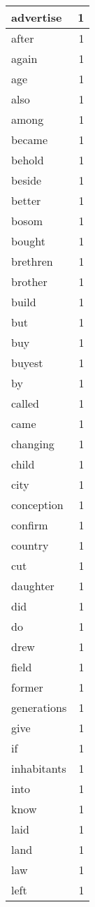 \begin{center}
\begin{longtable}{l|r}
advertise & 1 \\ \hline
after & 1 \\ \hline
again & 1 \\ \hline
age & 1 \\ \hline
also & 1 \\ \hline
among & 1 \\ \hline
became & 1 \\ \hline
behold & 1 \\ \hline
beside & 1 \\ \hline
better & 1 \\ \hline
bosom & 1 \\ \hline
bought & 1 \\ \hline
brethren & 1 \\ \hline
brother & 1 \\ \hline
build & 1 \\ \hline
but & 1 \\ \hline
buy & 1 \\ \hline
buyest & 1 \\ \hline
by & 1 \\ \hline
called & 1 \\ \hline
came & 1 \\ \hline
changing & 1 \\ \hline
child & 1 \\ \hline
city & 1 \\ \hline
conception & 1 \\ \hline
confirm & 1 \\ \hline
country & 1 \\ \hline
cut & 1 \\ \hline
daughter & 1 \\ \hline
did & 1 \\ \hline
do & 1 \\ \hline
drew & 1 \\ \hline
field & 1 \\ \hline
former & 1 \\ \hline
generations & 1 \\ \hline
give & 1 \\ \hline
if & 1 \\ \hline
inhabitants & 1 \\ \hline
into & 1 \\ \hline
know & 1 \\ \hline
laid & 1 \\ \hline
land & 1 \\ \hline
law & 1 \\ \hline
left & 1 \\ \hline

\end{longtable}
\end{center}
